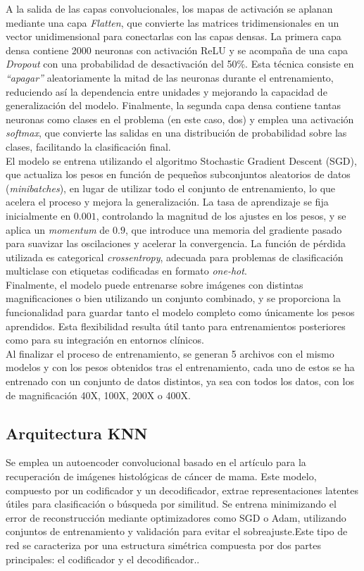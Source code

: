 \documentclass[12pt]{article} %
\begin{document}
A la salida de las capas convolucionales, los mapas de activación se aplanan mediante una capa \textit{Flatten}, que convierte las matrices tridimensionales en un vector unidimensional para conectarlas con las capas densas. La primera capa densa contiene 2000 neuronas con activación ReLU y se acompaña de una capa \textit{Dropout} con una probabilidad de desactivación del 50\%. Esta técnica consiste en \textit{“apagar”} aleatoriamente la mitad de las neuronas durante el entrenamiento, reduciendo así la dependencia entre unidades y mejorando la capacidad de generalización del modelo. Finalmente, la segunda capa densa contiene tantas neuronas como clases en el problema (en este caso, dos) y emplea una activación \textit{softmax}, que convierte las salidas en una distribución de probabilidad sobre las clases, facilitando la clasificación final.\\

El modelo se entrena utilizando el algoritmo Stochastic Gradient Descent (SGD), que actualiza los pesos en función de pequeños subconjuntos aleatorios de datos (\textit{minibatches}), en lugar de utilizar todo el conjunto de entrenamiento, lo que acelera el proceso y mejora la generalización. La tasa de aprendizaje se fija inicialmente en $0.001$, controlando la magnitud de los ajustes en los pesos, y se aplica un \textit{momentum} de $0.9$, que introduce una memoria del gradiente pasado para suavizar las oscilaciones y acelerar la convergencia. La función de pérdida utilizada es categorical \textit{crossentropy}, adecuada para problemas de clasificación multiclase con etiquetas codificadas en formato \textit{one-hot}.\\

Finalmente, el modelo puede entrenarse sobre imágenes con distintas magnificaciones o bien utilizando un conjunto combinado, y se proporciona la funcionalidad para guardar tanto el modelo completo como únicamente los pesos aprendidos. Esta flexibilidad resulta útil tanto para entrenamientos posteriores como para su integración en entornos clínicos.\\

Al finalizar el proceso de entrenamiento, se generan 5 archivos con el mismo modelos y con los pesos obtenidos tras el entrenamiento, cada uno de estos se ha entrenado con un conjunto de datos distintos, ya sea con todos los datos, con los de magnificación 40X, 100X, 200X o 400X. 

\subsection{Arquitectura KNN}
Se emplea un autoencoder convolucional basado en el artículo \cite{minarno2021cnn} para la recuperación de imágenes histológicas de cáncer de mama. Este modelo, compuesto por un codificador y un decodificador, extrae representaciones latentes útiles para clasificación o búsqueda por similitud. Se entrena minimizando el error de reconstrucción mediante optimizadores como SGD o Adam, utilizando conjuntos de entrenamiento y validación para evitar el sobreajuste.Este tipo de red se caracteriza por una estructura simétrica compuesta por dos partes principales: el codificador y el decodificador.. \\
\end{document}

